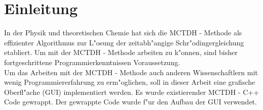 \chapter{Einleitung}

In der Physik und theoretischen Chemie hat sich die MCTDH - Methode als effizienter Algorithmus zur L"osung der zeitabh"angige Schr"odingergleichung etabliert.
Um mit der MCTDH - Methode arbeiten zu k"onnen, sind bisher fortgeschrittene Programmierkenntnissen Voraussetzung.\\
Um das Arbeiten mit der MCTDH - Methode auch anderen Wissenschaftlern mit wenig Programmiererfahrung zu erm"oglichen, soll in dieser Arbeit eine grafische Oberfl"ache (GUI) implementiert werden.
Es wurde existierender MCTDH - C++ Code gewrappt. Der gewrappte Code wurde f"ur den Aufbau der GUI verwendet.
